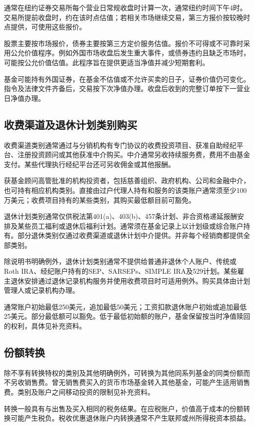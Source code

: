 \documentclass[UTF8,fontset=none,11pt,a4paper]{ctexart}
\begin{document}
通常在纽约证券交易所每个营业日常规收盘时计算一次，通常纽约时间下午4时。交易所提前收盘时，约在该时点估值；若相关市场继续交易，第三方报价按较晚时点提供，可使用这些报价。


股票主要按市场报价，债券主要按第三方定价服务估值。报价不可得或不可靠时采用公允价值程序。例如外国市场收盘后发生重大事件，或债券违约且缺乏市场时，可能按公允价值估值。此程序旨在提供更适当净值并减少短期套利。


基金可能持有外国证券，在基金不估值或不允许买卖的日子，证券价值仍可变化。指令及法律文件齐备后，交易按下次净值办理。收盘后收到的完整订单按下一营业日净值办理。


\subsection*{收费渠道及退休计划类别购买}
收费渠道类别通常通过与分销机构有专门协议的收费投资项目、获准自助经纪平台、注册投资顾问或其他获准中介购买。中介通常另收持续服务费，费用不由基金支付。某些代理执行经纪平台还可另收佣金或其他报酬。


获基金顾问高管批准的机构投资者，包括慈善组织、政府机构、公司和金融中介，也可持有相应机构类别。直接由过户代理人持有和服务的该类账户通常须至少100万美元；收费项目持有的某些类别，其购买最低额目前可豁免。


退休计划类别通常仅供税法第401(a)、403(b)、457条计划、非合资格递延报酬安排及某些员工福利或退休后福利计划。通常须在基金记录上以计划级或综合账户持有。部分退休类别仅通过收费渠道或退休计划中介提供。并非每个经销商都提供全部类别。


除说明书明确例外，退休计划类别通常不提供给普通非退休个人账户、传统或Roth IRA、经纪账户持有的SEP、SARSEPs、SIMPLE IRA及529计划。某些雇主退休安排通过退休记录机构服务并使用收费项目时可适用例外。购买具体由计划管理人或记录机构办理。


通常账户初始最低250美元，追加最低50美元；工资扣款退休账户初始或追加最低25美元。部分最低额可以豁免。低于最低初始额的账户，基金保留按当时净值赎回的权利，具体见补充资料。


\subsection*{份额转换}
除不享有转换特权的类别及其他明确例外，可转换为其他同系列基金的同类份额而不另收销售费。曾无销售费买入的货币市场基金转入其他基金，可能产生适用销售费。类别及账户之间移动投资的限制见补充资料。


转换一般具有与出售及买入相同的税务结果。在应税账户，价值高于成本的份额转换可能产生税负。税收优惠退休账户内转换通常不产生联邦或州所得税资本损益。
\end{document}
